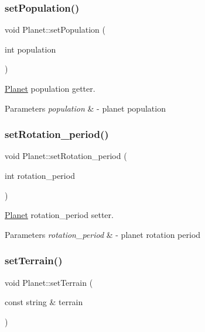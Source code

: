 \subsubsection{\texorpdfstring{set\+Population()}{setPopulation()}}
{\footnotesize\ttfamily void Planet\+::set\+Population (\begin{DoxyParamCaption}\item[{int}]{population }\end{DoxyParamCaption})}



\hyperlink{class_planet}{Planet} population getter. 


\begin{DoxyParams}{Parameters}
{\em population} & -\/ planet population \\
\hline
\end{DoxyParams}
\mbox{\label{class_planet_a90228c089e9603f53d736dec4ce6ccf9}} 
\subsubsection{\texorpdfstring{set\+Rotation\+\_\+period()}{setRotation\_period()}}
{\footnotesize\ttfamily void Planet\+::set\+Rotation\+\_\+period (\begin{DoxyParamCaption}\item[{int}]{rotation\+\_\+period }\end{DoxyParamCaption})}



\hyperlink{class_planet}{Planet} rotation\+\_\+period setter. 


\begin{DoxyParams}{Parameters}
{\em rotation\+\_\+period} & -\/ planet rotation period \\
\hline
\end{DoxyParams}
\mbox{\label{class_planet_a797a4e0d4af91723bde31e42c5139eab}} 
\subsubsection{\texorpdfstring{set\+Terrain()}{setTerrain()}}
{\footnotesize\ttfamily void Planet\+::set\+Terrain (\begin{DoxyParamCaption}\item[{const string \&}]{terrain }\end{DoxyParamCaption})}



